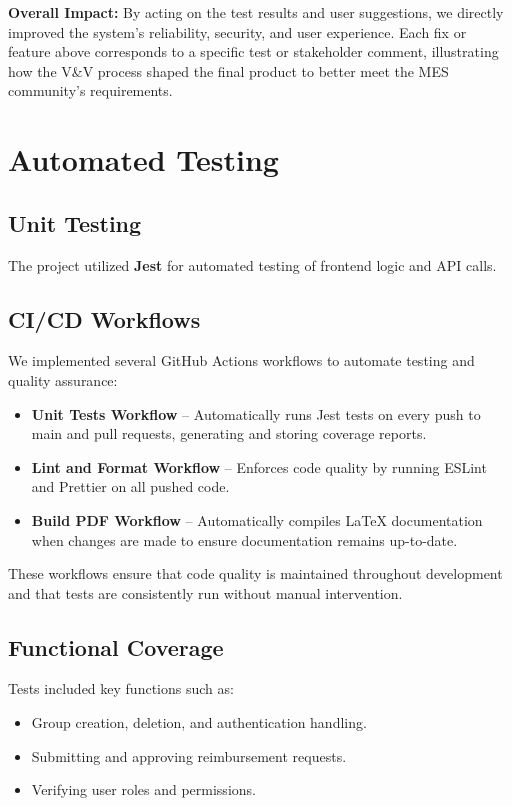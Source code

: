 \documentclass[12pt, titlepage]{article}
\begin{document}
\noindent
\textbf{Overall Impact:} 
By acting on the test results and user suggestions, we directly improved the
system’s reliability, security, and user experience. Each fix or feature
above corresponds to a specific test or stakeholder comment, illustrating 
how the V\&V process shaped the final product to better meet the MES 
community’s requirements.

\section{Automated Testing}

\subsection*{Unit Testing}
The project utilized \textbf{Jest} for automated testing of frontend logic and API calls.

\subsection*{CI/CD Workflows}
We implemented several GitHub Actions workflows to automate testing and quality assurance:

\begin{itemize}
    \item \textbf{Unit Tests Workflow} -- Automatically runs Jest tests on every push to main and pull requests, generating and storing coverage reports.
    \item \textbf{Lint and Format Workflow} -- Enforces code quality by running ESLint and Prettier on all pushed code.
    \item \textbf{Build PDF Workflow} -- Automatically compiles LaTeX documentation when changes are made to ensure documentation remains up-to-date.
\end{itemize}

These workflows ensure that code quality is maintained throughout development and that tests are consistently run without manual intervention.

\subsection*{Functional Coverage}
Tests included key functions such as:
\begin{itemize}
    \item Group creation, deletion, and authentication handling.
    \item Submitting and approving reimbursement requests.
    \item Verifying user roles and permissions.
\end{itemize}
\end{document}
